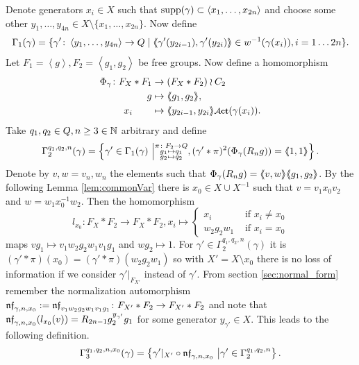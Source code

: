 \documentclass[a4paper,11pt]{amsart}
\begin{document}
 Denote generators $x_i\in X$ such that $\textup{supp}(\gamma) \subset \left<x_1,\ldots,x_{2n}\right>$ and choose some 
 other $y_1,\ldots,y_{4n} \in X \setminus \{x_1,\ldots,x_{2n}\}$. 
 Now define
 \[\Gamma_1(\gamma) = \{\gamma' \colon \left< y_1,\ldots ,y_{4n}\right> \to Q \mid \langle\negthickspace\langle\gamma'(y_{2i-1}),\gamma'(y_{2i})\rangle\negthickspace\rangle\in w^{-1}(\gamma(x_i)),i=1\ldots2n\}.\] 
 Let $F_1=\left<g\right>,F_2=\left<g_1,g_2\right>$ be free groups. 
 Now define a homomorphism  
 \begin{align*}
  \Phi_{\gamma}\colon F_X*F_1 &\to (F_X*F_2)\wr C_2 \\ g&\mapsto \pair{g_1,g_2},\\ x_i\qquad &\mapsto \pair{y_{2i-1},y_{2i}}\act(\gamma(x_i)).
 \end{align*}
Take $q_1,q_2 \in Q,n\geq3\in \mathbb{N}$ arbitrary and define
 \[\Gamma_2^{q_1,q_2,n}(\gamma) = \left\{\gamma'\in \Gamma_1(\gamma) \ \middle \vert \substack{\pi\colon F_2\to Q\\
										g_1\mapsto q_1 \\
										g_2\mapsto q_2 }, (\gamma'*\pi)^2(\Phi_\gamma(R_ng))=\langle\negthickspace\langle1,1\rangle\negthickspace\rangle\right\}.\] 
 Denote by $v,w=v_n,w_n$ the elements such that $\Phi_\gamma(R_ng)=\langle\negthickspace\langle v,w\rangle\negthickspace\rangle\langle\negthickspace\langle g_1,g_2\rangle\negthickspace\rangle$. By the following Lemma \ref{lem:commonVar} there is 
 $x_0 \in X\cup X^{-1}$ such that $v=v_1x_0v_2$ and $w=w_1x_0^{-1}w_2$. Then the homomorphism
 \[l_{x_0}\colon F_X*F_2\to F_X*F_2, x_i \mapsto \begin{cases}
						x_i &\text{ if } x_i\neq {x_0} \\
						w_2g_2w_1 &\text{ if }x_i= {x_0} 
                                             \end{cases}\]
 maps $vg_1 \mapsto v_1w_2g_2w_1v_1g_1$ and $wg_2\mapsto 1$. 
 For $\gamma'\in \Gamma_2^{q_1,q_2,n}(\gamma)$ it is $(\gamma'*\pi)(x_0)=({\gamma'*\pi})(w_2g_2w_1)$ so with $X'=X\setminus x_0$ there is no loss of information if 
 we consider $\gamma'|_{F_{X'}}$ instead of $\gamma'$.
 From section \ref{sec:normal_form} remember the normalization 
 automorphism $\mathfrak{nf}_{\gamma,n,x_0}:=\mathfrak{nf}_{v_1w_2g_2w_1v_1g_1}\colon F_{X'}*F_2 \to F_{X'}*F_2$
  and note that
 $\mathfrak{nf}_{\gamma,n,x_0}(l_{x_0}(v))=R_{2n-1}g_2^{{y_{\gamma'}}}g_1$ for some generator ${y_{\gamma'}}\in X$.
 This leads to the following definition.
 \[\Gamma_3^{q_1,q_2,n,x_0}(\gamma) = \left\{\gamma'|_{X'} \circ \mathfrak{nf}_{\gamma,n,x_0} \ \middle \vert \gamma' \in \Gamma_2^{q_1,q_2,n} \right\}.\] 
\end{document}
